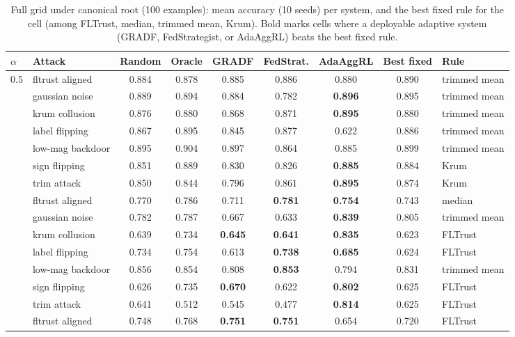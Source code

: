 \begin{table}[t]
\centering
\small
\caption{Full grid under canonical root (100 examples): mean accuracy (10 seeds) per system, and the best fixed rule for the cell (among FLTrust, median, trimmed mean, Krum). Bold marks cells where a deployable adaptive system (GRADF, FedStrategist, or AdaAggRL) beats the best fixed rule.}
\label{tab:full-grid-root100}
\begin{tabular}{llccccccl}
\toprule
$\alpha$ & Attack & Random & Oracle & GRADF & FedStrat. & AdaAggRL & Best fixed & Rule \\
\midrule
0.5 & fltrust aligned & 0.884 & 0.878 & 0.885 & 0.886 & 0.880 & 0.890 & trimmed mean \\
 & gaussian noise & 0.889 & 0.894 & 0.884 & 0.782 & \textbf{0.896} & 0.895 & trimmed mean \\
 & krum collusion & 0.876 & 0.880 & 0.868 & 0.871 & \textbf{0.895} & 0.880 & trimmed mean \\
 & label flipping & 0.867 & 0.895 & 0.845 & 0.877 & 0.622 & 0.886 & trimmed mean \\
 & low-mag backdoor & 0.895 & 0.904 & 0.897 & 0.864 & 0.885 & 0.899 & trimmed mean \\
 & sign flipping & 0.851 & 0.889 & 0.830 & 0.826 & \textbf{0.885} & 0.884 & Krum \\
 & trim attack & 0.850 & 0.844 & 0.796 & 0.861 & \textbf{0.895} & 0.874 & Krum \\
\addlinespace
0.1 & fltrust aligned & 0.770 & 0.786 & 0.711 & \textbf{0.781} & \textbf{0.754} & 0.743 & median \\
 & gaussian noise & 0.782 & 0.787 & 0.667 & 0.633 & \textbf{0.839} & 0.805 & trimmed mean \\
 & krum collusion & 0.639 & 0.734 & \textbf{0.645} & \textbf{0.641} & \textbf{0.835} & 0.623 & FLTrust \\
 & label flipping & 0.734 & 0.754 & 0.613 & \textbf{0.738} & \textbf{0.685} & 0.624 & FLTrust \\
 & low-mag backdoor & 0.856 & 0.854 & 0.808 & \textbf{0.853} & 0.794 & 0.831 & trimmed mean \\
 & sign flipping & 0.626 & 0.735 & \textbf{0.670} & 0.622 & \textbf{0.802} & 0.625 & FLTrust \\
 & trim attack & 0.641 & 0.512 & 0.545 & 0.477 & \textbf{0.814} & 0.625 & FLTrust \\
\addlinespace
0.05 & fltrust aligned & 0.748 & 0.768 & \textbf{0.751} & \textbf{0.751} & 0.654 & 0.720 & FLTrust \\

\end{tabular}
\end{table}
